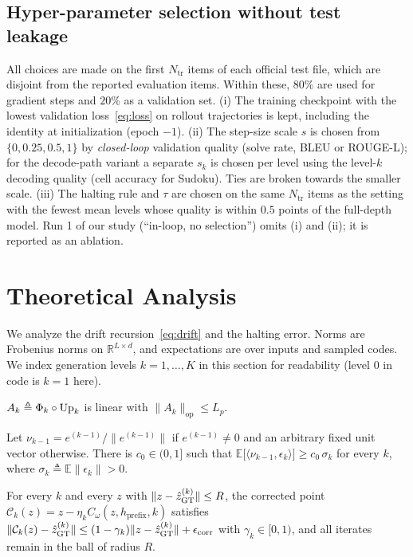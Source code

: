 \subsection{Hyper-parameter selection without test leakage}
\label{sec:select}
All choices are made on the first $N_{\mathrm{tr}}$ items of each official test file, which are disjoint from the reported evaluation items. Within these, $80\%$ are used for gradient steps and $20\%$ as a validation set. (i) The training checkpoint with the lowest validation loss~\eqref{eq:loss} on rollout trajectories is kept, including the identity at initialization (epoch $-1$). (ii) The step-size scale $s$ is chosen from $\{0,0.25,0.5,1\}$ by \emph{closed-loop} validation quality (solve rate, BLEU or ROUGE-L); for the decode-path variant a separate $s_k$ is chosen per level using the level-$k$ decoding quality (cell accuracy for Sudoku). Ties are broken towards the smaller scale. (iii) The halting rule and $\tau$ are chosen on the same $N_{\mathrm{tr}}$ items as the setting with the fewest mean levels whose quality is within $0.5$ points of the full-depth model. Run 1 of our study (``in-loop, no selection'') omits (i) and (ii); it is reported as an ablation.





\section{Theoretical Analysis}
\label{sec:theory}
We analyze the drift recursion~\eqref{eq:drift} and the halting error. Norms are Frobenius norms on $\mathbb{R}^{L\times d}$, and expectations are over inputs and sampled codes. We index generation levels $k=1,\dots,K$ in this section for readability (level $0$ in code is $k=1$ here).

\begin{assumption}\label{as:lip}
$A_k\triangleq\Phi_k\circ\mathrm{Up}_k$ is linear with $\|A_k\|_{\mathrm{op}}\le L_p$.
\end{assumption}
\begin{assumption}\label{as:coh}
Let $\nu_{k-1}=e^{(k-1)}/\|e^{(k-1)}\|$ if $e^{(k-1)}\neq0$ and an arbitrary fixed unit vector otherwise. There is $c_0\in(0,1]$ such that $\mathbb{E}\big[\langle \nu_{k-1},\epsilon_k\rangle\big]\ge c_0\,\sigma_k$ for every $k$, where $\sigma_k\triangleq\mathbb{E}\|\epsilon_k\|>0$.
\end{assumption}
\begin{assumption}\label{as:corr}
For every $k$ and every $z$ with $\|z-\hat{z}^{(k)}_{\mathrm{GT}}\|\le R$, the corrected point $\mathcal{C}_k(z)=z-\eta_kC_\omega(z,h_{\mathrm{prefix}},k)$ satisfies $\|\mathcal{C}_k(z)-\hat{z}^{(k)}_{\mathrm{GT}}\|\le(1-\gamma_k)\|z-\hat{z}^{(k)}_{\mathrm{GT}}\|+\epsilon_{\mathrm{corr}}$ with $\gamma_k\in[0,1)$, and all iterates remain in the ball of radius $R$.
\end{assumption}

